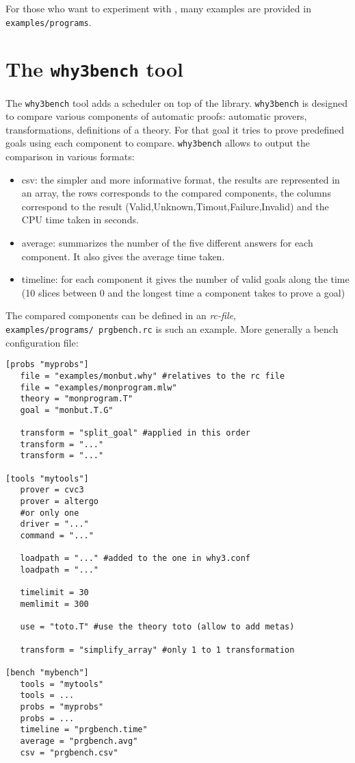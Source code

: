 For those who want to experiment with \whyml, many examples are provided in
\texttt{examples/programs}.

\section{The \texttt{why3bench} tool}

The \texttt{why3bench} tool adds a scheduler on top of the \why
library. \texttt{why3bench} is designed to compare various components
of automatic proofs: automatic provers, transformations, definitions
of a theory. For that goal it tries to prove predefined goals using
each component to compare. \texttt{why3bench} allows to output the
comparison in various formats:
\begin{itemize}
\item csv: the simpler and more informative format, the results are
  represented in an array, the rows corresponds to the
  compared components, the columns correspond to the result
  (Valid,Unknown,Timout,Failure,Invalid) and the CPU time taken in seconds.
\item average: summarizes the number of the five different answers
  for each component. It also gives the average time taken.
\item timeline: for each component it gives the number of valid goals
  along the time (10 slices between 0 and the longest time a component
  takes to prove a goal)
\end{itemize}

The compared components can be defined in an \emph{rc-file},
\texttt{examples/programs/\ prgbench.rc} is such an example. More
generally a bench configuration file:
\begin{verbatim}
[probs "myprobs"]
   file = "examples/monbut.why" #relatives to the rc file
   file = "examples/monprogram.mlw"
   theory = "monprogram.T"
   goal = "monbut.T.G"

   transform = "split_goal" #applied in this order
   transform = "..."
   transform = "..."

[tools "mytools"]
   prover = cvc3
   prover = altergo
   #or only one
   driver = "..."
   command = "..."

   loadpath = "..." #added to the one in why3.conf
   loadpath = "..."

   timelimit = 30
   memlimit = 300

   use = "toto.T" #use the theory toto (allow to add metas)

   transform = "simplify_array" #only 1 to 1 transformation

[bench "mybench"]
   tools = "mytools"
   tools = ...
   probs = "myprobs"
   probs = ...
   timeline = "prgbench.time"
   average = "prgbench.avg"
   csv = "prgbench.csv"
\end{verbatim}

